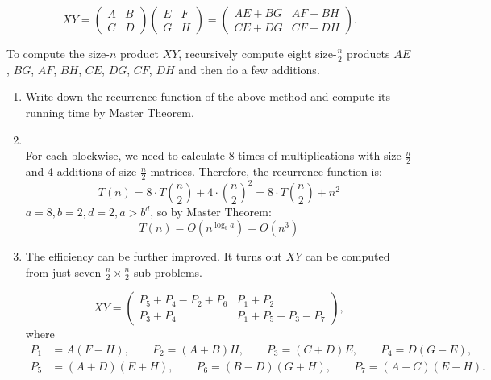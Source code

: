 \documentclass[12pt,a4paper]{article}
\makeatletter
\newtheorem*{solution}{Solution}
\theoremstyle{definition}
\renewenvironment{solution}[1][Solution] {\par\pushQED{\qed}\normalfont\topsep6\p@\@plus6\p@\relax\trivlist\item[\hskip\labelsep\bfseries#1\@addpunct{.}]\ignorespaces}{\popQED\endtrivlist\@endpefalse} \makeatother
\makeatother
\begin{document}
\begin{enumerate}
 \begin{displaymath}
 XY=
\left(\begin{array}{c|c}
A & B \\
\hline
C & D \end{array}\right)
\left(\begin{array}{c|c}
E & F \\
\hline
G & H \end{array}\right)
=
\left(\begin{array}{c|c}
AE+BG & AF+BH \\
\hline
CE+DG & CF+DH \end{array}\right).
 \end{displaymath}

To compute the size-$n$ product $XY$, recursively compute eight size-$\frac{n}{2}$ products $AE$,  $BG$, $AF$, $BH$, $CE$, $DG$, $CF$, $DH$ and then do a few additions.

\begin{enumerate}
\item Write down the recurrence function of the above method and compute its running time by Master Theorem.

\begin{solution}
~\\
For each blockwise, we need to calculate 8 times of multiplications with size-$\frac{n}{2}$ and 4 additions of size-$\frac{n}{2}$ matrices. 
Therefore, the recurrence function is: 
$$
T(n) = 8 \cdot T(\frac{n}{2}) + 4 \cdot {(\frac{n}{2})^2} =  8 \cdot T(\frac{n}{2}) + n^2
$$
$a = 8, b = 2, d = 2, a > b^d$, so by Master Theorem:
$$
T(n) = O(n^{\log_b a}) = O(n^3)
$$

\end{solution}

\item The efficiency can be further improved. It turns out $XY$ can be computed from just seven $\frac{n}{2}\times \frac{n}{2}$ sub problems.

\begin{displaymath}
 XY=
\left(\begin{array}{c|c}
P_{5}+P_{4}-P_{2}+P_{6} & P_{1}+P_{2} \\
\hline
P_{3}+P_{4} & P_{1}+P_{5}-P_{3}-P_{7} \end{array}\right),
\end{displaymath}
where
\begin{align*}
P_{1}&=A(F-H), \qquad P_{2}=(A+B)H, \qquad P_{3}=(C+D)E, \qquad P_{4}=D(G-E),\\
P_{5}&=(A+D)(E+H),\qquad P_{6}=(B-D)(G+H),\qquad P_{7}=(A-C)(E+H).
\end{align*}


\end{enumerate}
\end{enumerate}
\end{document}
